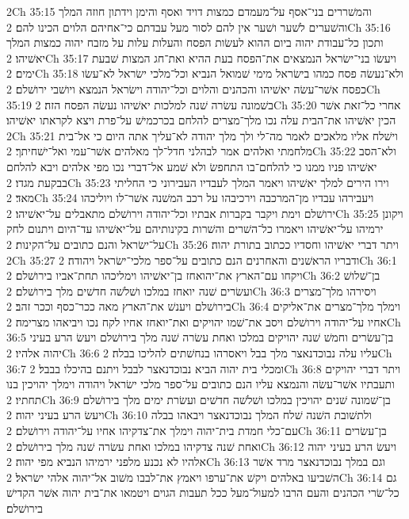 2Ch 35:15  והמשׁררים בני־אסף על־מעמדם כמצות דויד ואסף והימן וידתון חוזה המלך והשׁערים לשׁער ושׁער אין להם לסור מעל עבדתם כי־אחיהם הלוים הכינו להם׃
2Ch 35:16  ותכון כל־עבודת יהוה ביום ההוא לעשׂות הפסח והעלות עלות על מזבח יהוה כמצות המלך יאשׁיהו׃
2Ch 35:17  ויעשׂו בני־ישׂראל הנמצאים את־הפסח בעת ההיא ואת־חג המצות שׁבעת ימים׃
2Ch 35:18  ולא־נעשׂה פסח כמהו בישׂראל מימי שׁמואל הנביא וכל־מלכי ישׂראל לא־עשׂו כפסח אשׁר־עשׂה יאשׁיהו והכהנים והלוים וכל־יהודה וישׂראל הנמצא ויושׁבי ירושׁלם׃
2Ch 35:19  בשׁמונה עשׂרה שׁנה למלכות יאשׁיהו נעשׂה הפסח הזה׃
2Ch 35:20  אחרי כל־זאת אשׁר הכין יאשׁיהו את־הבית עלה נכו מלך־מצרים להלחם בכרכמישׁ על־פרת ויצא לקראתו יאשׁיהו׃
2Ch 35:21  וישׁלח אליו מלאכים לאמר מה־לי ולך מלך יהודה לא־עליך אתה היום כי אל־בית מלחמתי ואלהים אמר לבהלני חדל־לך מאלהים אשׁר־עמי ואל־ישׁחיתך׃
2Ch 35:22  ולא־הסב יאשׁיהו פניו ממנו כי להלחם־בו התחפשׂ ולא שׁמע אל־דברי נכו מפי אלהים ויבא להלחם בבקעת מגדו׃
2Ch 35:23  וירו הירים למלך יאשׁיהו ויאמר המלך לעבדיו העבירוני כי החליתי מאד׃
2Ch 35:24  ויעבירהו עבדיו מן־המרכבה וירכיבהו על רכב המשׁנה אשׁר־לו ויוליכהו ירושׁלם וימת ויקבר בקברות אבתיו וכל־יהודה וירושׁלם מתאבלים על־יאשׁיהו׃
2Ch 35:25  ויקונן ירמיהו על־יאשׁיהו ויאמרו כל־השׁרים והשׁרות בקינותיהם על־יאשׁיהו עד־היום ויתנום לחק על־ישׂראל והנם כתובים על־הקינות׃
2Ch 35:26  ויתר דברי יאשׁיהו וחסדיו ככתוב בתורת יהוה׃
2Ch 35:27  ודבריו הראשׁנים והאחרנים הנם כתובים על־ספר מלכי־ישׂראל ויהודה׃
2Ch 36:1  ויקחו עם־הארץ את־יהואחז בן־יאשׁיהו וימליכהו תחת־אביו בירושׁלם׃
2Ch 36:2  בן־שׁלושׁ ועשׂרים שׁנה יואחז במלכו ושׁלשׁה חדשׁים מלך בירושׁלם׃
2Ch 36:3  ויסירהו מלך־מצרים בירושׁלם ויענשׁ את־הארץ מאה ככר־כסף וככר זהב׃
2Ch 36:4  וימלך מלך־מצרים את־אליקים אחיו על־יהודה וירושׁלם ויסב את־שׁמו יהויקים ואת־יואחז אחיו לקח נכו ויביאהו מצרימה׃
2Ch 36:5  בן־עשׂרים וחמשׁ שׁנה יהויקים במלכו ואחת עשׂרה שׁנה מלך בירושׁלם ויעשׂ הרע בעיני יהוה אלהיו׃
2Ch 36:6  עליו עלה נבוכדנאצר מלך בבל ויאסרהו בנחשׁתים להליכו בבלה׃
2Ch 36:7  ומכלי בית יהוה הביא נבוכדנאצר לבבל ויתנם בהיכלו בבבל׃
2Ch 36:8  ויתר דברי יהויקים ותעבתיו אשׁר־עשׂה והנמצא עליו הנם כתובים על־ספר מלכי ישׂראל ויהודה וימלך יהויכין בנו תחתיו׃
2Ch 36:9  בן־שׁמונה שׁנים יהויכין במלכו ושׁלשׁה חדשׁים ועשׂרת ימים מלך בירושׁלם ויעשׂ הרע בעיני יהוה׃
2Ch 36:10  ולתשׁובת השׁנה שׁלח המלך נבוכדנאצר ויבאהו בבלה עם־כלי חמדת בית־יהוה וימלך את־צדקיהו אחיו על־יהודה וירושׁלם׃
2Ch 36:11  בן־עשׂרים ואחת שׁנה צדקיהו במלכו ואחת עשׂרה שׁנה מלך בירושׁלם׃
2Ch 36:12  ויעשׂ הרע בעיני יהוה אלהיו לא נכנע מלפני ירמיהו הנביא מפי יהוה׃
2Ch 36:13  וגם במלך נבוכדנאצר מרד אשׁר השׁביעו באלהים ויקשׁ את־ערפו ויאמץ את־לבבו משׁוב אל־יהוה אלהי ישׂראל׃
2Ch 36:14  גם כל־שׂרי הכהנים והעם הרבו למעול־מעל ככל תעבות הגוים ויטמאו את־בית יהוה אשׁר הקדישׁ בירושׁלם׃
